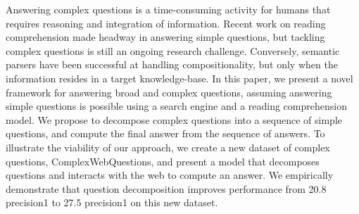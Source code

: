 Answering complex questions is a time-consuming activity for humans that requires reasoning and integration of information. Recent work on reading comprehension made headway in answering simple questions, but tackling complex questions is still an ongoing research challenge. Conversely, semantic parsers have been successful at handling compositionality, but only when the information resides in a target knowledge-base. In this paper, we present a novel framework for answering broad and complex questions, assuming answering simple questions is possible using a search engine and a reading comprehension model. We propose to decompose complex questions into a sequence of simple questions, and compute the final answer from the sequence of answers. To illustrate the viability of our approach, we create a new dataset of complex questions, ComplexWebQuestions, and present a model that decomposes questions and interacts with the web to compute an answer. We empirically demonstrate that question decomposition improves performance from 20.8 precision\@1 to 27.5 precision\@1 on this new dataset.

